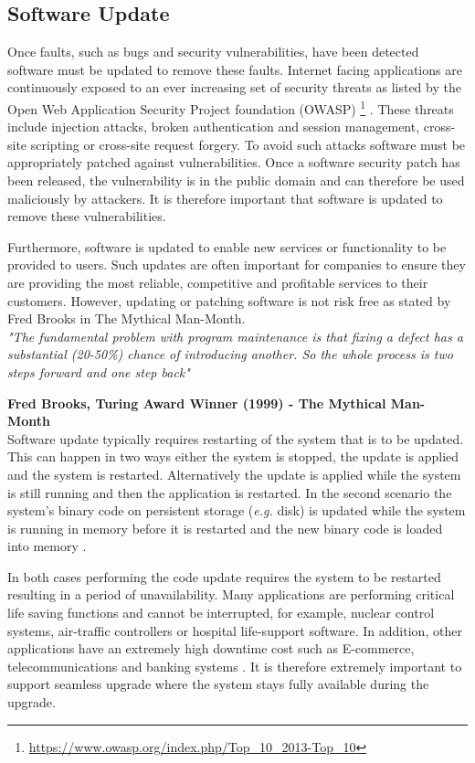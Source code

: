 \documentclass[a4paper,11pt,twoside]{article}
\begin{document}
\subsection{Software Update} 

Once faults, such as bugs and security vulnerabilities, have been detected software must be updated to remove these faults. Internet facing applications are continuously exposed to an ever increasing set of security threats as listed by the Open Web Application Security Project foundation (OWASP) \footnote{\url{https://www.owasp.org/index.php/Top_10_2013-Top_10}} . These threats include injection attacks, broken authentication and session management, cross-site scripting or cross-site request forgery. To avoid such attacks software must be appropriately patched against vulnerabilities. Once a software security patch has been released, the vulnerability is in the public domain and can therefore be used maliciously by attackers. It is therefore important that software is updated to remove these vulnerabilities.

Furthermore, software is updated to enable new services or functionality to be provided to users. Such updates are often important for companies to ensure they are providing the most reliable, competitive and profitable services to their customers. However, updating or patching software is not risk free as stated by Fred Brooks in The Mythical Man-Month. \\

\noindent\textit{ "The fundamental problem with program maintenance is that fixing a defect has a substantial (20-50\%) chance of introducing another. So the whole process is two steps forward and one step back"}  

\hfill \textbf{Fred Brooks, Turing Award Winner (1999) -  The Mythical Man-Month} \\

Software update typically requires restarting of the system that is to be updated. This can happen in two ways either the system is stopped, the update is applied and the system is restarted. Alternatively the update is applied while the system is still running and then the application is restarted. In the second scenario the system's binary code on persistent storage (\textit{e.g.} disk) is updated while the system is running in memory before it is restarted and the new binary code is loaded into memory \cite{Java}. 

In both cases performing the code update requires the system to be restarted resulting in a period of unavailability. Many applications are performing critical life saving functions and cannot be interrupted, for example, nuclear control systems, air-traffic controllers or hospital life-support software. In addition, other applications have an extremely high downtime cost such as E-commerce, telecommunications and banking systems \cite{fly}. It is therefore extremely important to support seamless upgrade where the system stays fully available during the upgrade. 
\end{document}
